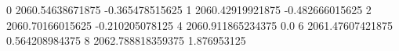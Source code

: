 0 2060.54638671875 -0.365478515625
1 2060.42919921875 -0.482666015625
2 2060.70166015625 -0.210205078125
4 2060.911865234375 0.0
6 2061.47607421875 0.564208984375
8 2062.788818359375 1.876953125
